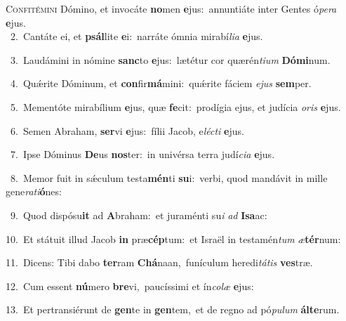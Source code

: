 \lettrine{\initial\textcolor{\initialcolor}{C}}{onfitémini} Dómino, et invocáte \textbf{no}\-men \textbf{e}\-jus:~\star annuntiáte inter Gentes ó\-\textit{pe}\-\textit{ra} \textbf{e}\-jus.\\
{\numbfont\textcolor{\numbcolor}{~2.}}~Cantáte ei, et \textbf{psál}\-lite \textbf{e}\-i:~\star narráte ómnia mirabí\-\textit{li}\-\textit{a} \textbf{e}\-jus.\par
{\numbfont\textcolor{\numbcolor}{~3.}}~Laudámini in nómine \textbf{sanc}\-to \textbf{e}\-jus:~\star lætétur cor quærén\-\textit{ti}\-\textit{um} \textbf{Dó}\-\textbf{mi}num.\par
{\numbfont\textcolor{\numbcolor}{~4.}}~Quǽrite Dóminum, et \textbf{con}\-fir\-\textbf{má}\-mini:~\star quǽrite fáciem \textit{e}\-\textit{jus} \textbf{sem}\-per.\par
{\numbfont\textcolor{\numbcolor}{~5.}}~Mementóte mirabílium \textbf{e}\-jus, quæ \textbf{fe}\-cit:~\star prodígia ejus, et judícia \textit{o}\-\textit{ris} \textbf{e}\-jus.\par
{\numbfont\textcolor{\numbcolor}{~6.}}~Semen Abraham, \textbf{ser}\-vi \textbf{e}\-jus:~\star fílii Jacob, e\-\textit{léc}\-\textit{ti} \textbf{e}\-jus.\par
{\numbfont\textcolor{\numbcolor}{~7.}}~Ipse Dóminus \textbf{De}\-us \textbf{nos}\-ter:~\star in univérsa terra judí\-\textit{ci}\-\textit{a} \textbf{e}\-jus.\par
{\numbfont\textcolor{\numbcolor}{~8.}}~Memor fuit in sǽculum testa\-\textbf{mén}\-ti \textbf{su}\-i:~\star verbi, quod mandávit in mille gene\-\textit{ra}\-\textit{ti}\textbf{ó}nes:\par
{\numbfont\textcolor{\numbcolor}{~9.}}~Quod dispósu\textbf{it} ad \textbf{A}\-braham:~\star et juraménti su\textit{i} \textit{ad} \textbf{I}\-\textbf{sa}ac:\par
{\numbfont\textcolor{\numbcolor}{10.}}~Et státuit illud Jacob \textbf{in} præ\-\textbf{cép}\-tum:~\star et Israël in testamén\textit{tum} \textit{æ}\-\textbf{tér}num:\par
{\numbfont\textcolor{\numbcolor}{11.}}~Dicens: Tibi dabo \textbf{ter}\-ram \textbf{Chá}\-naan,~\star funículum heredi\-\textit{tá}\-\textit{tis} \textbf{ves}\-træ.\par
{\numbfont\textcolor{\numbcolor}{12.}}~Cum essent \textbf{nú}\-mero \textbf{bre}\-vi,~\star paucíssimi et ín\-\textit{co}\-\textit{læ} \textbf{e}\-jus:\par
{\numbfont\textcolor{\numbcolor}{13.}}~Et pertransiérunt de \textbf{gen}\-te in \textbf{gen}\-tem,~\star et de regno ad pó\-\textit{pu}\-\textit{lum} \textbf{ál}\-\textbf{te}rum.\par
